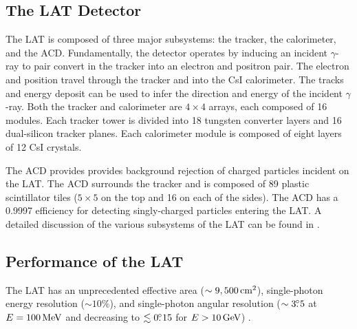 \subsection{The \acs{LAT} Detector}

The \ac{LAT} is composed of three major subsystems: the tracker, the
calorimeter, and the \ac{ACD}. Fundamentally, the detector operates by
inducing an incident $\gamma$-ray to pair convert in the tracker into
an electron and positron pair. The electron and position travel through
the tracker and into the \ac{CsI} calorimeter.  The tracks and energy
deposit can be used to infer the direction and energy of the incident
$\gamma$-ray.  Both the tracker and calorimeter are $4\times4$ arrays,
each composed of 16 modules.  Each tracker tower is divided into 18
tungsten converter layers and 16 dual-silicon tracker planes. Each
calorimeter module is composed of eight layers of 12 \ac{CsI} crystals.

The \ac{ACD} provides provides
background rejection of charged particles incident
on the \ac{LAT}.  The \ac{ACD} surrounds the tracker and is composed
of 89 plastic scintillator tiles ($5\times5$ on the top and 16
on each of the sides). The \ac{ACD} has a 0.9997 efficiency for
detecting singly-charged particles entering the \ac{LAT}.  A detailed
discussion of the various subsystems of the LAT can be found in
\citep{atwood_2009a_large-telescope}.

\subsection{Performance of the \acs{LAT}}

The \ac{LAT} 
has an unprecedented effective area ($\sim9,500\,\text{cm}^2$),
single-photon energy resolution ($\sim10\%$), and single-photon
angular resolution ($\sim3\mbox{$.\!\!^\circ$}5$ at $E=100\,\text{MeV}$
and decreasing to $\lesssim0\mbox{$.\!\!^\circ$}15$ for $E>10\,\text{GeV}$)
\citep{atwood_2009a_large-telescope}.

